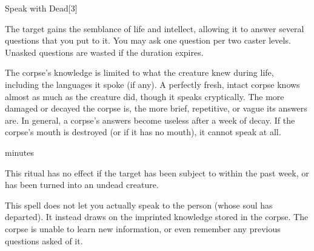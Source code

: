 \begin{spellsection}{Speak with Dead}[3]
    \begin{spellheader}
    \end{spellheader}
    \begin{spellcontent}
        \begin{spelltargetinginfo}
            \spellrng{\rngclose}
        \end{spelltargetinginfo}
        \begin{spelleffects}

            \spelleffect The target gains the semblance of life and intellect, allowing it to answer several questions that you put to it. You may ask one question per two caster levels. Unasked questions are wasted if the duration expires.

            The corpse's knowledge is limited to what the creature knew during life, including the languages it spoke (if any). A perfectly fresh, intact corpse knows almost as much as the creature did, though it speaks cryptically. The more damaged or decayed the corpse is, the more brief, repetitive, or vague its answers are. In general, a corpse's answers become useless after a week of decay. If the corpse's mouth is destroyed (or if it has no mouth), it cannot speak at all.

             minutes \dismissable
        \end{spelleffects}
    \end{spellcontent}
    \begin{spellfooter}
        \spellnotes This ritual has no effect if the target has been subject to  within the past week, or has been turned into an undead creature.

        \par This spell does not let you actually speak to the person (whose soul has departed). It instead draws on the imprinted knowledge stored in the corpse. The corpse is unable to learn new information, or even remember any previous questions asked of it.
    \end{spellfooter}
\end{spellsection}

